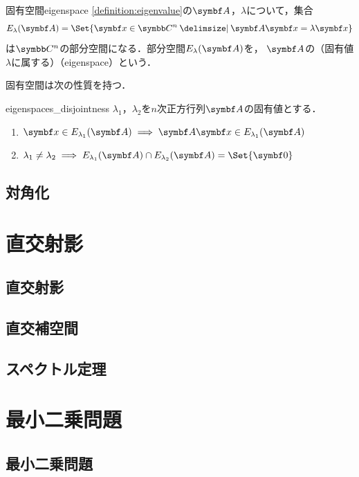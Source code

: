 \documentclass[../../main]{subfiles}
\begin{document}
\begin{definition}{固有空間}{eigenspace}
\cref{definition:eigenvalue}の\(\mat{A}\)，\(\lambda\)について，集合
\[
  E_\lambda(\mat{A}) = \Set{\vect{x}\in\numset{C}^n\given\mat{A}\vect{x}=\lambda\vect{x}}
\]
は\(\numset{C}^n\)の部分空間になる．部分空間\(E_\lambda(\mat{A})\)を，
\(\mat{A}\)の（固有値\(\lambda\)に属する）（eigenspace）という．
\end{definition}

固有空間は次の性質を持つ．

\begin{proposition}{}{eigenspaces_disjointness}
\(\lambda_1\)，\(\lambda_2\)を\(n\)次正方行列\(\mat{A}\)の固有値とする．
\begin{enumerate}
  \item \(\vect{x}\in E_{\lambda_1}(\mat{A})\implies\mat{A}\vect{x}\in E_{\lambda_1}(\mat{A})\)
  \item \(\lambda_1\neq\lambda_2\implies E_{\lambda_1}(\mat{A})\cap E_{\lambda_2}(\mat{A})=\Set{\zvec}\)
\end{enumerate}
\end{proposition}

\subsection{対角化}

\section{直交射影}
\subsection{直交射影}
\subsection{直交補空間}
\subsection{スペクトル定理}

\section{最小二乗問題}
\subsection{最小二乗問題}
\end{document}
